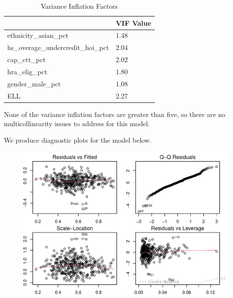 \documentclass[
  man,floatsintext]{apa6}
\begin{document}
\begin{table}[H]

\begin{center}
\begin{threeparttable}

\caption{\label{tab:imp-feat-model-vif-check}Variance Inflation Factors}

\begin{tabular}{ll}
\toprule
 & \multicolumn{1}{c}{VIF Value}\\
\midrule
ethnicity\_asian\_pct & 1.48\\
hs\_overage\_undercredit\_hoi\_pct & 2.04\\
cap\_ctt\_pct & 2.02\\
hra\_elig\_pct & 1.80\\
gender\_male\_pct & 1.08\\
ELL & 2.27\\
\bottomrule
\end{tabular}

\end{threeparttable}
\end{center}

\end{table}

None of the variance inflation factors are greater than five, so there are no multicollinearity issues to address for this model.

We produce diagnostic plots for the model below.

\begin{figure}[H]
\includegraphics[width=\textwidth]{final-project_files/figure-latex/plot-imp-feat-model-1} \caption{ }\label{fig:plot-imp-feat-model}
\end{figure}
\end{document}
